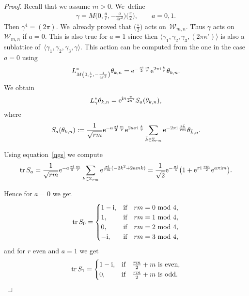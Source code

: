 \documentclass[10pt,a4paper]{amsart}
\newcommand\Z{{\mathbb Z}}
\newcommand\cW{{\mathcal W}}
\newcommand{\tr}{\mathop{{\rm tr}}}
\newcommand\la{\langle}
\newcommand\ra{\rangle}
\numberwithin{equation}{section}
\begin{document}
\begin{proof}
Recall that we assume $m>0$. We~define
\begin{gather*}
\gamma= M\bigg(0,\frac{a}{r},-\frac{a}{4r^2}\bigg)\bigg(\frac{\pi}{2}\bigg),\qquad a=0,1.
\end{gather*}
Then $\gamma^4=(2\pi)$. We~already proved that $\big(\frac \pi2\big)$ acts on~$\cW_{m,n}$. Thus $\gamma$ acts on~$\cW_{m,n}$ if $a=0$. This is also true for $a=1$ since then $\la \gamma_1,\gamma_2,\gamma_3,(2\pi \kappa')\ra$ is also a sublattice of~$\la \gamma_1,\gamma_2,\gamma_3,\gamma\ra$.
This action can be computed from the one in the case $a=0$ using
\begin{gather*}
L^*_{M\left(0,\frac1{r},-\frac1{4r^2}\right)}\theta_{k,n}={\rm e}^{-\frac{\pi {\rm i}}{2}\frac{m}{r}}{\rm e}^{2\pi {\rm i}\,\frac{k}{r}}\theta_{k,n}.
\end{gather*}
We obtain
\begin{gather*}
L^*_{\gamma}\theta_{k,n}={\rm e}^{{\rm i}n\frac{\pi}{2\kappa'}}S_a(\theta_{k,n}),
\end{gather*}
where
\begin{gather*}
S_a(\theta_{k,n}):=\frac{1}{\sqrt{rm}}{\rm e}^{-a\frac{\pi {\rm i}}{2}\frac{m}{r}}{\rm e}^{2a\pi {\rm i}\,\frac{k}{r}}\sum_{\bar k\in\Z_{rm}}{\rm e}^{-2\pi {\rm i}\,\frac{k\bar k}{rm}}\theta_{\bar k,n}.\end{gather*}

Using equation~\eqref{qgs} we compute
\begin{gather*}
\tr S_a=\frac{1}{\sqrt{rm}}{\rm e}^{-a\frac{\pi {\rm i}}{2}\frac{m}{r}}\sum_{k\in\Z_{rm}}{\rm e}^{\frac{\pi {\rm i}}{rm}(-2k^2+2amk)}
= \frac{1}{\sqrt{2}}{\rm e}^{-\frac{\pi {\rm i}}{4}}\big(1+{\rm e}^{\pi {\rm i}\,\frac{rm}{2}}{\rm e}^{a\pi {\rm i} m}\big).
\end{gather*}

Hence for $a=0$ we get
\begin{gather*}
\tr S_0=\begin{cases}
1-{\rm i},&\text{if}\quad rm=0\ {\rm mod}\ 4,
\\
1,&\text{if}\quad rm=1\ {\rm mod}\ 4,
\\
0,&\text{if}\quad rm=2\ {\rm mod}\ 4,
\\
-{\rm i},&\text{if}\quad rm=3\ {\rm mod}\ 4,
\end{cases}
\end{gather*}
and for $r$ even and $a=1$ we get
\begin{gather*}
\tr S_1=\begin{cases}
1-{\rm i},&\text{if\quad $\frac{rm}{2}+m$ is even},
\\[0ex]
0,&\text{if\quad $\frac{rm}{2}+m$ is odd}.
\end{cases}
\end{gather*}


\end{proof}
\end{document}
